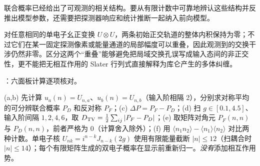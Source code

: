 联合概率已经给出了可观测的相关结构。要从有限计数中可靠地辨认这些结构并反推出模型参数，还需要把探测器响应和统计推断一起纳入前向模型。

\clearpage
\par\medskip 对任意相同的单电子幺正变换 $U\otimes U$，两条初始正交轨道的整体内积保持为零；不过它们在某一固定探测像素或能量通道的局部幅度可以重叠，因此观测到的交换干涉仍然非零。区分这两个“重叠”能够避免把局域交换孔误写成输入态间的非正交性，更不能把无相互作用的 Slater 行列式直接解释为库仑产生的多体纠缠。


\noindent {}：六面板计算逐项核对。\par\noindent (a,b) 先计算 $u_a(n)=U_{n,a}$、$u_b(n)=U_{n,b}$（输入阶相隔 2），分别求对称平均的可分辨联合概率 $P_D$ 和反对称 $P_F$；(c) $\Delta P=P_F-P_D$；(d) 扫 $g\in[0.1,4.5]$、输入阶间隔 $1,2,4,6$，取 $D_{\rm TV}=\tfrac12\sum_{ij}|P_F-P_D|$；(e) 取矩阵对角元 $P_F(n,n)$ 与 $P_D(n,n)$，前者严格为 0（计算舍入除外）；(f) 用 $\langle n_1n_2\rangle-\langle n_1\rangle\langle n_2\rangle$ 对比两种计数。单电子核 $U_{nk}=i^{n-k}J_{n-k}(2g)$ 使用有限能量截断 $|n|\le12$（扫耦合时 $|n|\le14$）；每个有限矩阵生成的双电子概率在显示前重新归一。\emph{没有}添加相互作用势。


